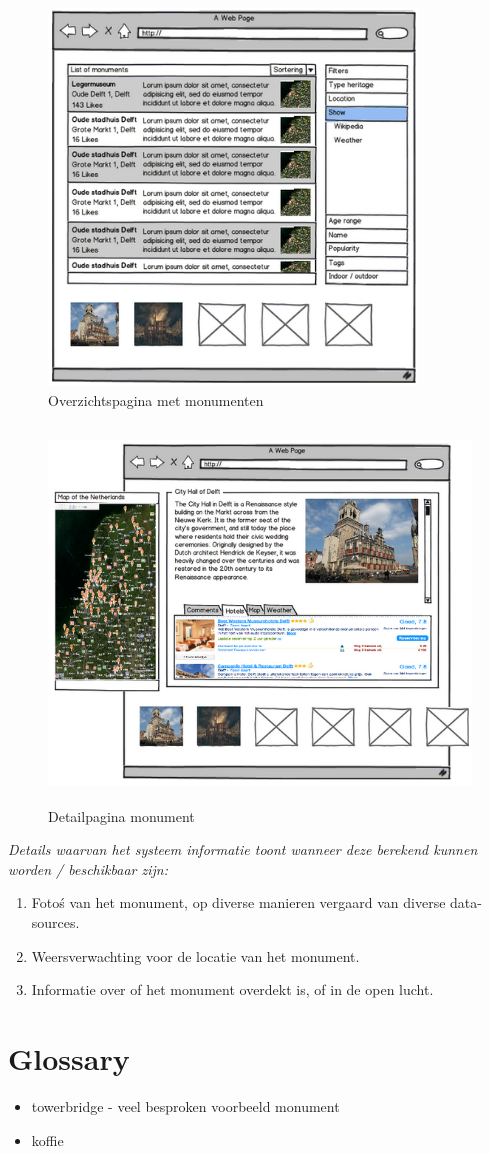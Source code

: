 \documentclass[a4paper,10pt]{article}
\begin{document}
			\begin{figure}[ht!]
				\centering
				\includegraphics[height=10cm]{interface2.png}
				\caption{Overzichtspagina met monumenten \label{interface2}}
			\end{figure}
			
			\begin{figure}[ht!]
				\centering
				\includegraphics[height=10cm]{interface3.png}
				\caption{Detailpagina monument \label{interface3}}
			\end{figure}
			\textit{Details waarvan het systeem informatie toont wanneer deze berekend kunnen worden / beschikbaar zijn:}
			\begin{enumerate}
				\item Foto\'s van het monument, op diverse manieren vergaard van diverse data-sources.
				\item Weersverwachting voor de locatie van het monument.
				\item Informatie over of het monument overdekt is, of in de open lucht.
			\end{enumerate}
	
	\clearpage
	\section{Glossary}
		\begin{itemize}
			\item towerbridge - veel besproken voorbeeld monument
			\item koffie
		\end{itemize}
\end{document}
